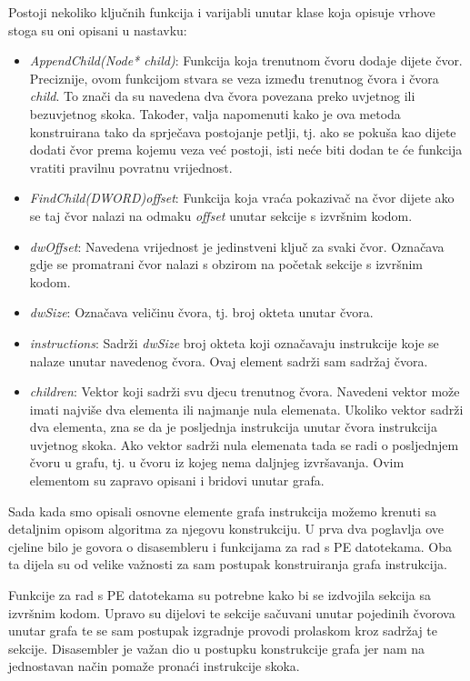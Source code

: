 \documentclass[times, utf8, diplomski, numeric]{fer}
\begin{document}
Postoji nekoliko ključnih funkcija i varijabli unutar klase koja opisuje vrhove
stoga su oni opisani u nastavku:

\begin{itemize}
\item \emph{AppendChild(Node* child)}: Funkcija koja trenutnom čvoru dodaje
dijete čvor. Preciznije, ovom funkcijom stvara se veza između trenutnog čvora i
čvora \emph{child}. To znači da su navedena dva čvora povezana preko uvjetnog
ili bezuvjetnog skoka. Također, valja napomenuti kako je ova metoda
konstruirana tako da sprječava postojanje petlji, tj. ako se pokuša kao
dijete dodati čvor prema kojemu veza već postoji, isti neće biti dodan te će
funkcija vratiti pravilnu povratnu vrijednost.
\item \emph{FindChild(DWORD)offset}: Funkcija koja vraća pokazivač na čvor			%
dijete ako se taj čvor nalazi na odmaku \emph{offset} unutar sekcije s izvršnim kodom.
\item \emph{dwOffset}: Navedena vrijednost je jedinstveni ključ za svaki
čvor. Označava gdje se promatrani čvor nalazi s obzirom na početak sekcije
s izvršnim kodom.
\item \emph{dwSize}: Označava veličinu čvora, tj. broj okteta unutar čvora.
\item \emph{instructions}: Sadrži \emph{dwSize} broj okteta koji označavaju instrukcije koje se nalaze unutar navedenog čvora. Ovaj element sadrži sam sadržaj čvora.
\item \emph{children}: Vektor koji sadrži svu djecu trenutnog čvora. Navedeni
vektor može imati najviše dva elementa ili najmanje nula elemenata. Ukoliko
vektor sadrži dva elementa, zna se da je posljednja instrukcija unutar čvora
instrukcija uvjetnog skoka. Ako vektor sadrži nula elemenata tada se radi o
posljednjem čvoru u grafu, tj. u čvoru iz kojeg nema daljnjeg izvršavanja. Ovim
elementom su zapravo opisani i bridovi unutar grafa.
\end{itemize}

Sada kada smo opisali osnovne elemente grafa instrukcija možemo krenuti sa
detaljnim opisom algoritma za njegovu konstrukciju. U prva dva poglavlja ove
cjeline bilo je govora o disasembleru i funkcijama za rad s PE datotekama. Oba
ta dijela su od velike važnosti za sam postupak konstruiranja grafa
instrukcija.

Funkcije za rad s PE datotekama su potrebne kako bi se izdvojila sekcija sa
izvršnim kodom. Upravo su dijelovi te sekcije sačuvani unutar pojedinih čvorova
unutar grafa te se sam postupak izgradnje provodi prolaskom kroz sadržaj te
sekcije. Disasembler je važan dio u postupku konstrukcije grafa jer nam na
jednostavan način pomaže pronaći instrukcije skoka.
\end{document}
